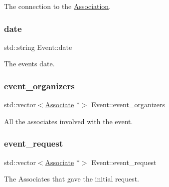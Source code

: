 The connection to the \hyperlink{classAssociation}{Association}. 

\mbox{\label{classEvent_a9a93c9d38211f84cd6e347690e177f11}} 
\subsubsection{\texorpdfstring{date}{date}}
{\footnotesize\ttfamily std\+::string Event\+::date\hspace{0.3cm}{\ttfamily [protected]}}



The event\textquotesingle{}s date. 

\mbox{\label{classEvent_ad35e04c759fdbfad75aed0b6e2eef63c}} 
\subsubsection{\texorpdfstring{event\+\_\+organizers}{event\_organizers}}
{\footnotesize\ttfamily std\+::vector$<$\hyperlink{classAssociate}{Associate} $\ast$$>$ Event\+::event\+\_\+organizers\hspace{0.3cm}{\ttfamily [protected]}}



All the associates involved with the event. 

\mbox{\label{classEvent_a6cec387dca85f0a0e8419cfc94eb320e}} 
\subsubsection{\texorpdfstring{event\+\_\+request}{event\_request}}
{\footnotesize\ttfamily std\+::vector$<$\hyperlink{classAssociate}{Associate} $\ast$$>$ Event\+::event\+\_\+request\hspace{0.3cm}{\ttfamily [protected]}}



The Associates that gave the initial request. 

\mbox{\label{classEvent_a3d1f28a3bde9ab718d5b0003f8ab5129}} 
